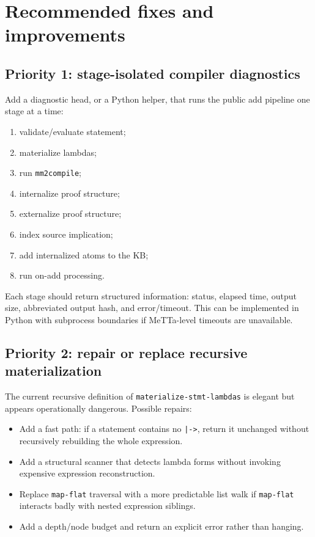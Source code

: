 \documentclass[11pt]{article}
\newcommand{\code}[1]{\texttt{#1}}
\begin{document}
\section{Recommended fixes and improvements}

\subsection{Priority 1: stage-isolated compiler diagnostics}

Add a diagnostic head, or a Python helper, that runs the public add pipeline one
stage at a time:
\begin{enumerate}
  \item validate/evaluate statement;
  \item materialize lambdas;
  \item run \code{mm2compile};
  \item internalize proof structure;
  \item externalize proof structure;
  \item index source implication;
  \item add internalized atoms to the KB;
  \item run on-add processing.
\end{enumerate}

Each stage should return structured information: status, elapsed time, output
size, abbreviated output hash, and error/timeout.  This can be implemented in
Python with subprocess boundaries if MeTTa-level timeouts are unavailable.

\subsection{Priority 2: repair or replace recursive materialization}

The current recursive definition of \code{materialize-stmt-lambdas} is elegant
but appears operationally dangerous.  Possible repairs:
\begin{itemize}
  \item Add a fast path: if a statement contains no \code{|->}, return it
  unchanged without recursively rebuilding the whole expression.
  \item Add a structural scanner that detects lambda forms without invoking
  expensive expression reconstruction.
  \item Replace \code{map-flat} traversal with a more predictable list walk if
  \code{map-flat} interacts badly with nested expression siblings.
  \item Add a depth/node budget and return an explicit error rather than hanging.
\end{itemize}
\end{document}
